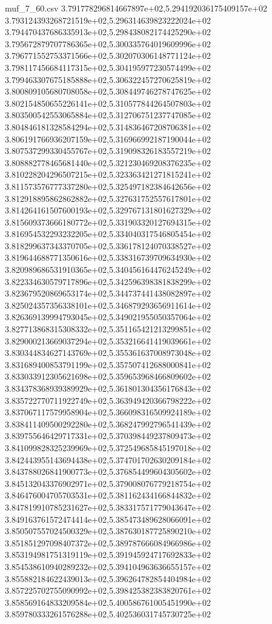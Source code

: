 \begin{filecontents*}{muf_7_60.csv}
3.791778296814667897e+02,5.294192036175409157e+02
3.793124393268721519e+02,5.296314639823222024e+02
3.794470437686335913e+02,5.298438082174425290e+02
3.795672879707786365e+02,5.300335764019609996e+02
3.796771552753371566e+02,5.302070306148771124e+02
3.798117456684117315e+02,5.304195977230574499e+02
3.799463307675185888e+02,5.306322457270625819e+02
3.800809105680708058e+02,5.308449746278747625e+02
3.802154850655226141e+02,5.310577844264507803e+02
3.803500542553065884e+02,5.312706751237747085e+02
3.804846181328584294e+02,5.314836467208706381e+02
3.806191766936207159e+02,5.316966992187190044e+02
3.807537299330455767e+02,5.319098326183557219e+02
3.808882778465681440e+02,5.321230469208376235e+02
3.810228204296507215e+02,5.323363421271815241e+02
3.811573576777337280e+02,5.325497182384642656e+02
3.812918895862862882e+02,5.327631752557617801e+02
3.814264161507600193e+02,5.329767131801627329e+02
3.815609373666180772e+02,5.331903320127694315e+02
3.816954532293232205e+02,5.334040317546805454e+02
3.818299637343370705e+02,5.336178124070338527e+02
3.819644688771350616e+02,5.338316739709634930e+02
3.820989686531910365e+02,5.340456164476245249e+02
3.822334630579717896e+02,5.342596398381838299e+02
3.823679520869653174e+02,5.344737441438082897e+02
3.825024357356338101e+02,5.346879293656911614e+02
3.826369139994793045e+02,5.349021955050357064e+02
3.827713868315308332e+02,5.351165421213299851e+02
3.829000213669037294e+02,5.353216641419039661e+02
3.830344834627143769e+02,5.355361637008973048e+02
3.831689400853791199e+02,5.357507412688000841e+02
3.833033912305621698e+02,5.359653968466809602e+02
3.834378368939389929e+02,5.361801304356176843e+02
3.835722770711922749e+02,5.363949420366798222e+02
3.837067117579958904e+02,5.366098316509924189e+02
3.838411409500292280e+02,5.368247992796541439e+02
3.839755646429717331e+02,5.370398449237809473e+02
3.841099828325239969e+02,5.372549685845197018e+02
3.842443955143694438e+02,5.374701702630209184e+02
3.843788026841900773e+02,5.376854499604305602e+02
3.845132043376902971e+02,5.379008076779218754e+02
3.846476004705703531e+02,5.381162434166844832e+02
3.847819910785231627e+02,5.383317571779043647e+02
3.849163761572474414e+02,5.385473489628066091e+02
3.850507557024500329e+02,5.387630187725890210e+02
3.851851297098407372e+02,5.389787666084966986e+02
3.853194981751319119e+02,5.391945924717692833e+02
3.854538610940289232e+02,5.394104963636655157e+02
3.855882184622439013e+02,5.396264782854404984e+02
3.857225702755090992e+02,5.398425382383820761e+02
3.858569164833209584e+02,5.400586761005451990e+02
3.859780333261576288e+02,5.402536031745730725e+02

\end{filecontents*}
